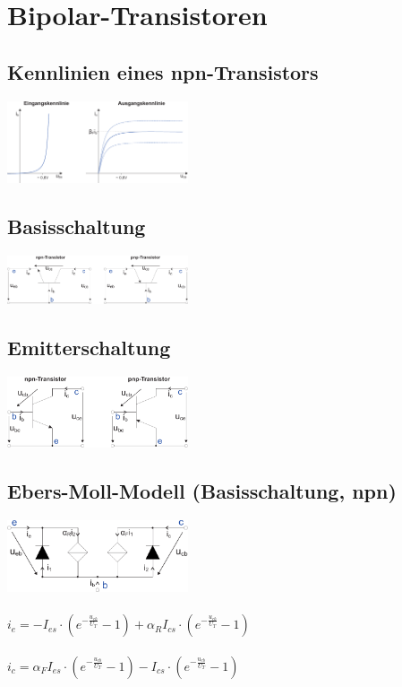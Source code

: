 \documentclass[a4paper,twocolumn,10pt]{article}
\begin{document}
\section*{Bipolar-Transistoren}
\subsection*{Kennlinien eines npn-Transistors}
\includegraphics[width=0.4\textwidth]{img/Kennlinie_Transistor}
\subsection*{Basisschaltung}
\includegraphics[width=0.4\textwidth]{img/Transistor_Basisschaltung}
\subsection*{Emitterschaltung}
\includegraphics[width=0.4\textwidth]{img/Transistor_Emitterschaltung}

\subsection*{Ebers-Moll-Modell (Basisschaltung, npn)}
\includegraphics[width=0.4\textwidth]{img/Ebers-Moll}\\\\
$i_e=-I_{es}\cdot (e^{-\frac{u_{eb}}{U_T}}-1)+\alpha_RI_{cs}\cdot (e^{-\frac{u_{cb}}{U_T}}-1)$\\\\
$i_c=\alpha_FI_{es}\cdot (e^{-\frac{u_{eb}}{U_T}}-1)-I_{cs}\cdot (e^{-\frac{u_{cb}}{U_T}}-1)$
\end{document}
